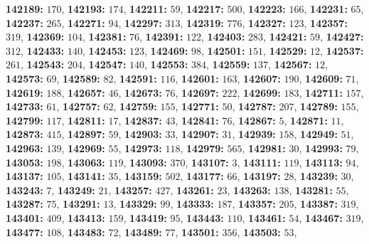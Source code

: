 \textsf{\bfseries 142189:} $170$, \textsf{\bfseries 142193:} $174$, \textsf{\bfseries 142211:} $59$, \textsf{\bfseries 142217:} $500$, \textsf{\bfseries 142223:} $166$, \textsf{\bfseries 142231:} $65$, \textsf{\bfseries 142237:} $265$, \textsf{\bfseries 142271:} $94$, \textsf{\bfseries 142297:} $313$, \textsf{\bfseries 142319:} $776$, \textsf{\bfseries 142327:} $123$, \textsf{\bfseries 142357:} $319$, \textsf{\bfseries 142369:} $104$, \textsf{\bfseries 142381:} $76$, \textsf{\bfseries 142391:} $122$, \textsf{\bfseries 142403:} $283$, \textsf{\bfseries 142421:} $59$, \textsf{\bfseries 142427:} $312$, \textsf{\bfseries 142433:} $140$, \textsf{\bfseries 142453:} $123$, \textsf{\bfseries 142469:} $98$, \textsf{\bfseries 142501:} $151$, \textsf{\bfseries 142529:} $12$, \textsf{\bfseries 142537:} $261$, \textsf{\bfseries 142543:} $204$, \textsf{\bfseries 142547:} $140$, \textsf{\bfseries 142553:} $384$, \textsf{\bfseries 142559:} $137$, \textsf{\bfseries 142567:} $12$, \textsf{\bfseries 142573:} $69$, \textsf{\bfseries 142589:} $82$, \textsf{\bfseries 142591:} $116$, \textsf{\bfseries 142601:} $163$, \textsf{\bfseries 142607:} $190$, \textsf{\bfseries 142609:} $71$, \textsf{\bfseries 142619:} $188$, \textsf{\bfseries 142657:} $46$, \textsf{\bfseries 142673:} $76$, \textsf{\bfseries 142697:} $222$, \textsf{\bfseries 142699:} $183$, \textsf{\bfseries 142711:} $157$, \textsf{\bfseries 142733:} $61$, \textsf{\bfseries 142757:} $62$, \textsf{\bfseries 142759:} $155$, \textsf{\bfseries 142771:} $50$, \textsf{\bfseries 142787:} $207$, \textsf{\bfseries 142789:} $155$, \textsf{\bfseries 142799:} $117$, \textsf{\bfseries 142811:} $17$, \textsf{\bfseries 142837:} $43$, \textsf{\bfseries 142841:} $76$, \textsf{\bfseries 142867:} $5$, \textsf{\bfseries 142871:} $11$, \textsf{\bfseries 142873:} $415$, \textsf{\bfseries 142897:} $59$, \textsf{\bfseries 142903:} $33$, \textsf{\bfseries 142907:} $31$, \textsf{\bfseries 142939:} $158$, \textsf{\bfseries 142949:} $51$, \textsf{\bfseries 142963:} $139$, \textsf{\bfseries 142969:} $55$, \textsf{\bfseries 142973:} $118$, \textsf{\bfseries 142979:} $565$, \textsf{\bfseries 142981:} $30$, \textsf{\bfseries 142993:} $79$, \textsf{\bfseries 143053:} $198$, \textsf{\bfseries 143063:} $119$, \textsf{\bfseries 143093:} $370$, \textsf{\bfseries 143107:} $3$, \textsf{\bfseries 143111:} $119$, \textsf{\bfseries 143113:} $94$, \textsf{\bfseries 143137:} $105$, \textsf{\bfseries 143141:} $35$, \textsf{\bfseries 143159:} $502$, \textsf{\bfseries 143177:} $66$, \textsf{\bfseries 143197:} $28$, \textsf{\bfseries 143239:} $30$, \textsf{\bfseries 143243:} $7$, \textsf{\bfseries 143249:} $21$, \textsf{\bfseries 143257:} $427$, \textsf{\bfseries 143261:} $23$, \textsf{\bfseries 143263:} $138$, \textsf{\bfseries 143281:} $55$, \textsf{\bfseries 143287:} $75$, \textsf{\bfseries 143291:} $13$, \textsf{\bfseries 143329:} $99$, \textsf{\bfseries 143333:} $187$, \textsf{\bfseries 143357:} $205$, \textsf{\bfseries 143387:} $319$, \textsf{\bfseries 143401:} $409$, \textsf{\bfseries 143413:} $159$, \textsf{\bfseries 143419:} $95$, \textsf{\bfseries 143443:} $110$, \textsf{\bfseries 143461:} $54$, \textsf{\bfseries 143467:} $319$, \textsf{\bfseries 143477:} $108$, \textsf{\bfseries 143483:} $72$, \textsf{\bfseries 143489:} $77$, \textsf{\bfseries 143501:} $356$, \textsf{\bfseries 143503:} $53$, 
